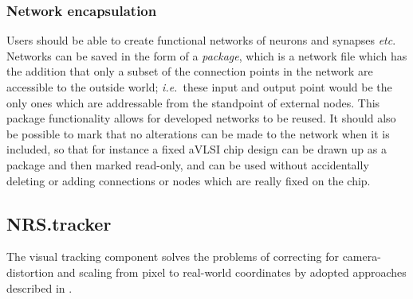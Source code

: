 \documentclass[pdftex,a4paper]{article}
\newif\ifpdf
\newcommand{\ie}{{\em i.e.\ }}
\newcommand{\et}{{\it etc}}
\newcommand{\code}[1]{{\tt \small #1}}
\begin{document}
\ifpdf
\begin{figure}[htb]
  \begin{center}
    \texttt{[image: java\_inbound\_routing.pdf]}
    \caption{Objects and processes involved in routing newly formed
    \code{Message} objects to individual \code{Variable} instances
    within an NRS component.}
    \label{pic:java_inbound_routing}
  \end{center}
\end{figure}
\fi



\subsubsection{Network encapsulation}

Users should be able to create functional networks of neurons and
synapses \et. Networks can be saved in the form of a {\em package},
which is a network file which has the addition that only a subset of
the connection points in the network are accessible to the outside
world; \ie these input and output point would be the only ones which
are addressable from the standpoint of external nodes. This package
functionality allows for developed networks to be reused. It should
also be possible to mark that no alterations can be made to the
network when it is included, so that for instance a fixed aVLSI chip
design can be drawn up as a package and then marked read-only, and can
be used without accidentally deleting or adding connections or nodes
which are really fixed on the chip.

\subsection{NRS.tracker}

The visual tracking component solves the problems of correcting for
camera-distortion and scaling from pixel to real-world coordinates by
adopted approaches described in \cite{Klancar2004}.



\end{document}
